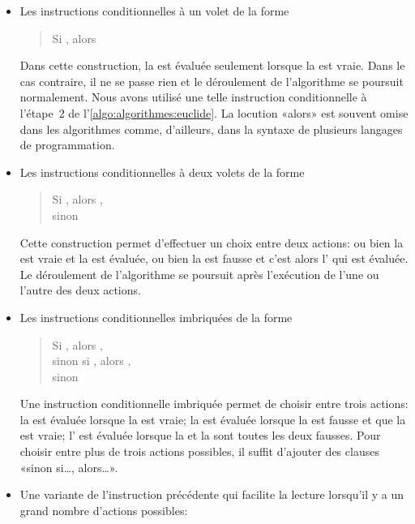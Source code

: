 \begin{itemize}
\item Les instructions conditionnelles à un volet de la forme
  \begin{quote}
    Si , alors 
  \end{quote}
  Dans cette construction, la  est évaluée seulement
  lorsque la  est vraie. Dans le cas contraire, il ne
  se passe rien et le déroulement de l'algorithme se poursuit
  normalement. Nous avons utilisé une telle instruction conditionnelle
  à l'étape~2 de l'\autoref{algo:algorithmes:euclide}. La locution
  «alors» est souvent omise dans les algorithmes comme, d'ailleurs,
  dans la syntaxe de plusieurs langages de programmation.
\item Les instructions conditionnelles à deux volets de la forme
  \begin{quote}
    Si , alors , \\
    sinon 
  \end{quote}
  Cette construction permet d'effectuer un choix entre deux actions:
  ou bien la  est vraie et la  est
  évaluée, ou bien la  est fausse et c'est alors
  l' qui est évaluée. Le déroulement de l'algorithme
  se poursuit après l'exécution de l'une ou l'autre des deux actions.
\item Les instructions conditionnelles imbriquées de la forme
  \begin{quote}
    Si , alors , \\
    sinon si , alors , \\
    sinon 
  \end{quote}
  Une instruction conditionnelle imbriquée permet de choisir entre
  trois actions: la  est évaluée lorsque la
   est vraie; la  est évaluée
  lorsque la  est fausse et que la
   est vraie; l' est évaluée
  lorsque la  et la  sont toutes
  les deux fausses. Pour choisir entre plus de trois actions
  possibles, il suffit d'ajouter des clauses «sinon si\dots, alors\dots».
\item Une variante de l'instruction précédente qui facilite la lecture
  lorsqu'il y a un grand nombre d'actions possibles:

\end{itemize}
